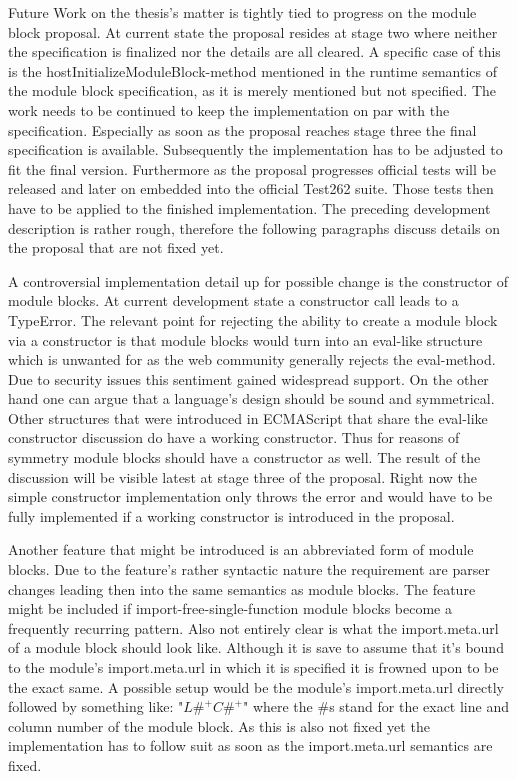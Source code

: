 Future Work on the thesis's matter is tightly tied to progress on the module block proposal. At current state the proposal resides at stage two where neither the specification is finalized nor the details are all cleared. A specific case of this is the hostInitializeModuleBlock-method mentioned in the runtime semantics of the module block specification, as it is merely mentioned but not specified. The work needs to be continued to keep the implementation on par with the specification. Especially as soon as the proposal reaches stage three the final specification is available. Subsequently the implementation has to be adjusted to fit the final version. Furthermore as the proposal progresses official tests will be released and later on embedded into the official Test262 suite. Those tests then have to be applied to the finished implementation. The preceding development description is rather rough, therefore the following paragraphs discuss details on the proposal that are not fixed yet.

A controversial implementation detail up for possible change is the constructor of module blocks. At current development state a constructor call leads to a TypeError. The relevant point for rejecting the ability to create a module block via a constructor is that module blocks would turn into an eval-like structure which is unwanted for as the web community generally rejects the eval-method. Due to security issues this sentiment gained widespread support. On the other hand one can argue that a language's design should be sound and symmetrical. Other structures that were introduced in ECMAScript that share the eval-like constructor discussion do have a working constructor. Thus for reasons of symmetry module blocks should have a constructor as well. The result of the discussion will be visible latest at stage three of the proposal. Right now the simple constructor implementation only throws the error and would have to be fully implemented if a working constructor is introduced in the proposal.

Another feature that might be introduced is an abbreviated form of module blocks. Due to the feature's rather syntactic nature the requirement are parser changes leading then into the same semantics as module blocks. The feature might be included if import-free-single-function module blocks become a frequently recurring pattern. Also not entirely clear is what the import.meta.url of a module block should look like. Although it is save to assume that it's bound to the module's import.meta.url in which it is specified it is frowned upon to be the exact same. A possible setup would be the module's import.meta.url directly followed by something like: "$L\#^+C\#^+$" where the \#s stand for the exact line and column number of the module block. As this is also not fixed yet the implementation has to follow suit as soon as the import.meta.url semantics are fixed.

